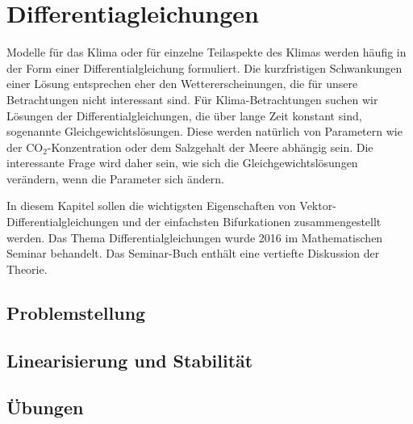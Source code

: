 %
%
%
\chapter{Differentiagleichungen\label{chapter:dgl}}
Modelle für das Klima oder für einzelne Teilaspekte des Klimas 
werden häufig in der Form einer Differentialgleichung formuliert.
Die kurzfristigen Schwankungen einer Lösung entsprechen 
eher den Wettererscheinungen, die für unsere Betrachtungen nicht
interessant sind.
Für Klima-Betrachtungen suchen wir Lösungen der Differentialgleichungen,
die über lange Zeit konstant sind, sogenannte Gleichgewichtslösungen.
Diese werden natürlich von Parametern wie der $\text{CO}_2$-Konzentration
oder dem Salzgehalt der Meere abhängig sein.
Die interessante Frage wird daher sein, wie sich die Gleichgewichtslösungen
verändern, wenn die Parameter sich ändern.

In diesem Kapitel sollen die wichtigsten Eigenschaften von
Vektor-Differentialgleichungen und der einfachsten Bifurkationen
zusammengestellt werden.
Das Thema Differentialgleichungen wurde 2016 im Mathematischen Seminar
behandelt.
Das Seminar-Buch \cite{skript:mathsem-dgl} enthält eine vertiefte Diskussion
der Theorie.

\section{Problemstellung}



\section{Linearisierung und Stabilität}

\section*{Übungen}
\begin{uebungsaufgaben}
\item

\end{uebungsaufgaben}

